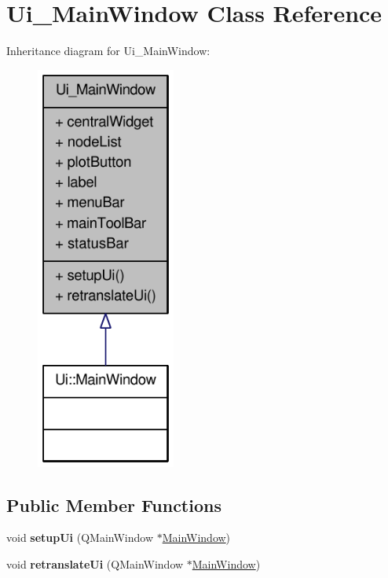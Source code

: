 \hypertarget{classUi__MainWindow}{
\section{Ui\_\-MainWindow Class Reference}
\label{classUi__MainWindow}
}


Inheritance diagram for Ui\_\-MainWindow:\nopagebreak
\begin{figure}[H]
\begin{center}
\leavevmode
\includegraphics[width=130pt]{classUi__MainWindow__inherit__graph}
\end{center}
\end{figure}
\subsection*{Public Member Functions}
\begin{DoxyCompactItemize}
\item 
\hypertarget{classUi__MainWindow_acf4a0872c4c77d8f43a2ec66ed849b58}{
void {\bfseries setupUi} (QMainWindow $\ast$\hyperlink{classMainWindow}{MainWindow})}
\label{classUi__MainWindow_acf4a0872c4c77d8f43a2ec66ed849b58}

\item 
\hypertarget{classUi__MainWindow_a097dd160c3534a204904cb374412c618}{
void {\bfseries retranslateUi} (QMainWindow $\ast$\hyperlink{classMainWindow}{MainWindow})}
\label{classUi__MainWindow_a097dd160c3534a204904cb374412c618}

\end{DoxyCompactItemize}

